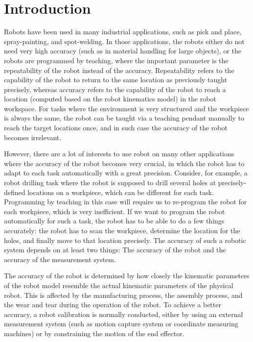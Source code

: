 \section{Introduction}
\label{sec:introduction}

Robots have been used in many industrial applications, such as pick and place, spray-painting, and spot-welding. In those applications, the robots either do not need very high accuracy (such as in material handling for large objects), or the robots are programmed by teaching, where the important parameter is the repeatability of the robot instead of the accuracy. Repeatability refers to the capability of the robot to return to the same location as previously taught precisely, whereas accuracy refers to the capability of the robot to reach a location (computed based on the robot kinematics model) in the robot workspace. For tasks where the environment is very structured and the workpiece is always the same, the robot can be taught via a teaching pendant manually to reach the target locations once, and in such case the accuracy of the robot becomes irrelevant. 

However, there are a lot of interests to use robot on many other applications where the accuracy of the robot becomes very crucial, in which the robot has to adapt to each task automatically with a great precision. Consider, for example, a robot drilling task where the robot is supposed to drill several holes at precisely-defined locations on a workpiece, which can be different for each task. Programming by teaching in this case will require us to re-program the robot for each workpiece, which is very inefficient. If we want to program the robot automatically for such a task, the robot has to be able to do a few things accurately: the robot has to scan the workpiece, determine the location for the holes, and finally
move to that location precisely. The accuracy of such a robotic system depends on at least two things: The accuracy of the robot and the accuracy of the measurement system. 

The accuracy of the robot is determined by how closely the kinematic parameters of the robot model resemble the actual kinematic parameters of the physical robot. This is affected by the manufacturing process, the assembly process, and the wear and tear during the operation of the robot. To achieve a better accuracy, a robot calibration is normally conducted, either by using an external measurement system (such as motion capture system or coordinate measuring machines) or by constraining the motion of the end effector.

